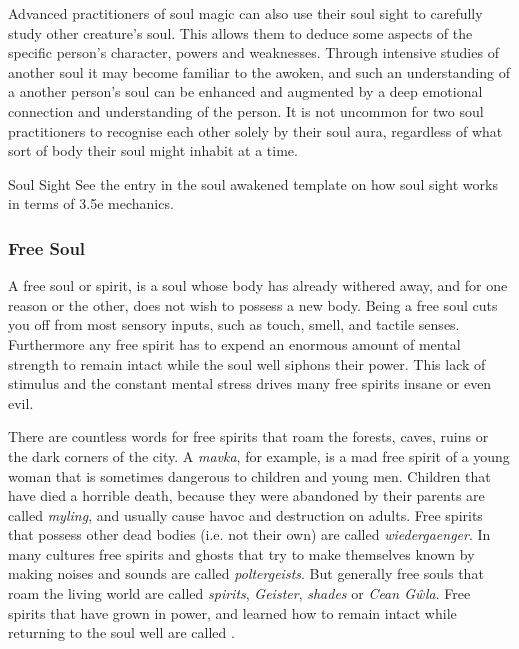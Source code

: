 Advanced practitioners of soul magic can also use their soul sight to
carefully study other creature's soul. This allows them to deduce some aspects
of the specific person's character, powers and weaknesses. Through intensive
studies of another soul it may become familiar to the awoken, and such an
understanding of a another person's soul can be enhanced and augmented by a
deep emotional connection and understanding of the person. It is not uncommon
for two soul practitioners to recognise each other solely by their soul aura,
regardless of what sort of body their soul might inhabit at a time.


\begin{35e}{Soul Sight}
  See the entry in the soul awakened template on how soul sight works in terms
  of 3.5e mechanics.
\end{35e}

\subsubsection{Free Soul}
\label{sec:Free Soul}

A free soul or spirit, is a soul whose body has already withered away, and for
one reason or the other, does not wish to possess a new body. Being a free
soul cuts you off from most sensory inputs, such as touch, smell, and tactile
senses. Furthermore any free spirit has to expend an enormous amount of mental
strength to remain intact while the soul well siphons their power. This lack
of stimulus and the constant mental stress drives many free spirits insane or
even evil.

There are countless words for free spirits that roam the forests, caves, ruins
or the dark corners of the city. A \emph{mavka}, for example, is a mad free
spirit of a young woman that is sometimes dangerous to children and young men.
Children that have died a horrible death, because they were abandoned by their
parents are called \emph{myling}, and usually cause havoc and destruction on
adults. Free spirits that possess other dead bodies (i.e. not their own) are
called \emph{wiedergaenger}. In many cultures free spirits and ghosts that try
to make themselves known by making noises and sounds are called
\emph{poltergeists}. But generally free souls that roam the living world are
called \emph{spirits}, \emph{Geister}, \emph{shades} or \emph{Cean Gŵla}. Free
spirits that have grown in power, and learned how to remain intact while
returning to the soul well are called .

